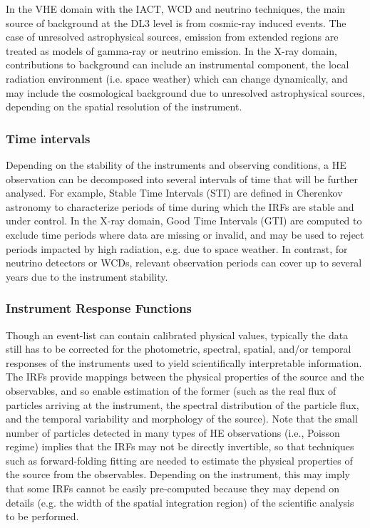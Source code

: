 \documentclass[11pt,a4paper]{ivoa}
\begin{document}
In the VHE domain with the IACT, WCD and neutrino techniques, the main source of background at the DL3 level is from
cosmic-ray induced events. The case of unresolved astrophysical sources, emission from extended regions are treated as
 models of gamma-ray or neutrino emission. In the X-ray domain, contributions to background can include an instrumental
component, the local radiation environment (i.e. space weather) which can change dynamically, and may include the
cosmological background due to unresolved astrophysical sources, depending on the spatial resolution of the instrument.

\subsubsection{Time intervals}

Depending on the stability of the instruments and observing conditions, a HE observation can be decomposed into several
intervals of time that will be further analysed. For example, Stable Time Intervals (STI) are defined in Cherenkov
astronomy to characterize periods of time during which the IRFs are stable and under control. In the X-ray domain, Good
Time Intervals (GTI) are computed to exclude time periods where data are missing or invalid, and may be used to reject
periods impacted by high radiation, e.g. due to space weather. In contrast, for neutrino detectors or WCDs, relevant
observation periods can cover up to several years due to the instrument stability.


\subsubsection{Instrument Response Functions}

Though an event-list can contain calibrated physical values, typically the data still has to be corrected for the
photometric, spectral, spatial, and/or temporal responses of the instruments used to yield scientifically interpretable
information. The IRFs provide mappings between the physical properties of the source and the observables, and so enable
estimation of the former (such as the real flux of particles arriving at the instrument, the spectral distribution of
the particle flux, and the temporal variability and morphology of the source).  Note that the small number of particles
detected in many types of HE observations (i.e., Poisson regime) implies that the IRFs may not be directly invertible,
so that techniques such as forward-folding fitting are needed to estimate the physical properties of the source from the
observables. Depending on the instrument, this may imply that some IRFs cannot be easily pre-computed because they may
depend on details (e.g. the width of the spatial integration region) of the scientific analysis to be performed.
\end{document}

